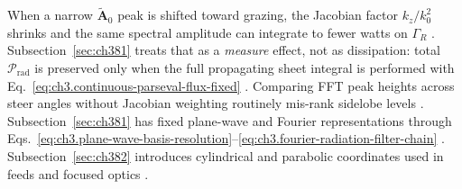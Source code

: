 When a narrow \(\widetilde{\mathbf{A}}_{0}\) peak is shifted toward grazing, the Jacobian factor \(k_{z}/k_{0}^{2}\) shrinks and the same spectral
amplitude can integrate to fewer watts on \(\Gamma_{R}\) \cite{jackson1999}. Subsection~\ref{sec:ch381} treats that as a
\emph{measure} effect, not as dissipation: total \(\mathcal{P}_{\mathrm{rad}}\) is preserved only when the full propagating sheet integral is
performed with Eq.~\eqref{eq:ch3.continuous-parseval-flux-fixed} \cite{harrington2001}. Comparing FFT peak heights across steer
angles without Jacobian weighting routinely mis-rank sidelobe levels \cite{jackson1999}.
Subsection~\ref{sec:ch381} has fixed plane-wave and Fourier representations through
Eqs.~\eqref{eq:ch3.plane-wave-basis-resolution}--\eqref{eq:ch3.fourier-radiation-filter-chain}
\cite{stratton1941}. Subsection~\ref{sec:ch382} introduces cylindrical and parabolic coordinates used in
feeds and focused optics \cite{hansen1988}.

